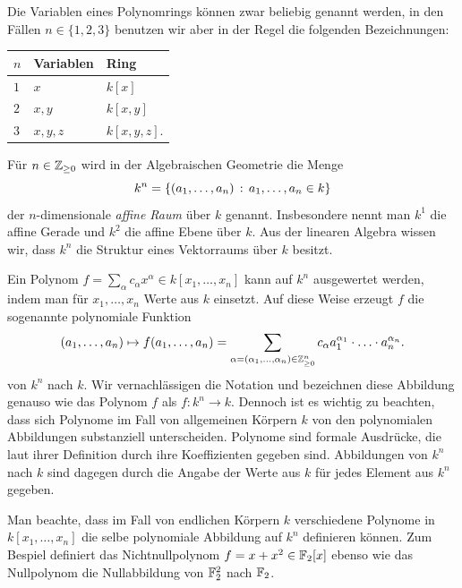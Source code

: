 \documentclass[11pt]{article}
\numberwithin{equation}{section}
\begin{document}
\begin{remark}
Die Variablen eines Polynomrings können zwar beliebig genannt werden, in den Fällen $n \in \{1,2,3\}$ benutzen wir aber in der Regel die folgenden Bezeichnungen: 
\begin{center} 
\begin{tabular}{l|ll} 
$n$	& Variablen & Ring 
\\	\hline $1$ & $x$ & $k[x]$
\\	$2$ & $x,y$ &  $k[x,y]$
\\ $3$ & $x,y,z$ & $k[x,y,z]$. 
\end{tabular} 
\end{center} 
\end{remark} 

\begin{definition}
	Für $n \in \mathbb{Z}_{\ge 0}$  wird in der Algebraischen Geometrie die Menge \[
		k^n = \left\{  (a_1,\ldots,a_n)  \,:\,  a_1,\ldots,a_n  \in k \right\}
	\] 
	der $n$-dimensionale \emph{affine Raum} über $k$ genannt. Insbesondere nennt man $k^1$ die affine Gerade und $k^2$ die affine Ebene über $k$. Aus der linearen Algebra wissen wir, dass $k^n$ die Struktur eines Vektorraums über $k$ besitzt. 
\end{definition} 

\begin{definition} 
Ein Polynom $f = \sum_{\alpha} c_\alpha x^\alpha  \in k[x_1,\ldots,x_n]$ kann auf $k^n$  ausgewertet werden, indem   man für $x_1,\ldots,x_n$ Werte aus $k$ einsetzt. Auf diese Weise erzeugt $f$ die sogenannte polynomiale Funktion 
\[
	(a_1,\ldots,a_n) \mapsto f(a_1,\ldots,a_n) = \sum_{\alpha = (\alpha_1,\ldots,\alpha_n) \in \mathbb{Z}_{\ge 0}^n} c_\alpha a_1^{\alpha_1} \cdot \ldots \cdot a_n^{\alpha_n}. 
\]
von $k^n$ nach $k$. Wir vernachlässigen die Notation und bezeichnen diese Abbildung genauso wie das Polynom $f$ als $ f : k^n \to k$. Dennoch ist es wichtig zu beachten, dass sich Polynome im Fall von allgemeinen Körpern $k$ von den polynomialen Abbildungen substanziell unterscheiden. Polynome sind formale Ausdrücke, die laut ihrer Definition durch ihre Koeffizienten gegeben sind. Abbildungen von $k^n$ nach $k$ sind dagegen durch die Angabe der Werte aus $k$ für jedes Element aus $k^n$ gegeben. 
\end{definition} 

\begin{remark}
Man beachte, dass im Fall von endlichen Körpern $k$ verschiedene Polynome in $k[x_1,\ldots,x_n]$ die selbe polynomiale Abbildung auf $k^n$ definieren können.  Zum Bespiel definiert das  Nichtnullpolynom $f = x+x^2 \in \mathbb{F}_2[x]$ ebenso wie das Nullpolynom die Nullabbildung von $\mathbb{F}_2^2$ nach $\mathbb{F}_2$. 
\end{remark} 
\end{document}
